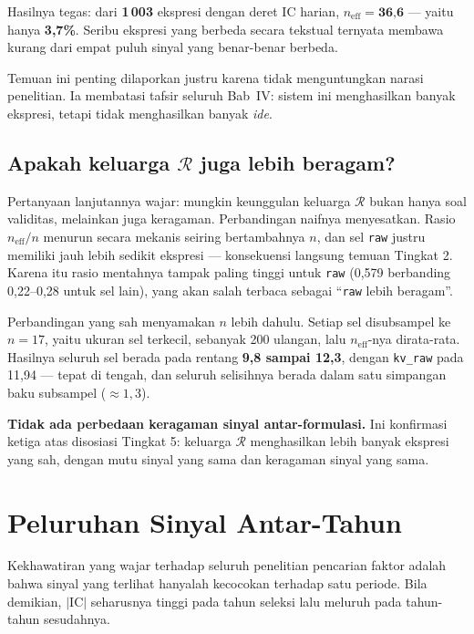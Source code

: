 \documentclass{laporanta1statugm}
\newcommand{\code}[1]{\texttt{#1}}
\begin{document}
Hasilnya tegas: dari \textbf{1\,003} ekspresi dengan deret IC harian,
$n_{\text{eff}} = \textbf{36{,}6}$ --- yaitu hanya \textbf{3,7\%}. Seribu
ekspresi yang berbeda secara tekstual ternyata membawa kurang dari empat puluh
sinyal yang benar-benar berbeda.

Temuan ini penting dilaporkan justru karena tidak menguntungkan narasi
penelitian. Ia membatasi tafsir seluruh Bab~IV: sistem ini menghasilkan banyak
ekspresi, tetapi tidak menghasilkan banyak \emph{ide}.

\subsection{Apakah keluarga $\mathcal{R}$ juga lebih beragam?}

Pertanyaan lanjutannya wajar: mungkin keunggulan keluarga $\mathcal{R}$ bukan
hanya soal validitas, melainkan juga keragaman. Perbandingan naifnya
menyesatkan. Rasio $n_{\text{eff}}/n$ menurun secara mekanis seiring
bertambahnya $n$, dan sel \code{raw} justru memiliki jauh lebih sedikit
ekspresi --- konsekuensi langsung temuan Tingkat 2. Karena itu rasio mentahnya
tampak paling tinggi untuk \code{raw} (0,579 berbanding 0,22--0,28 untuk sel
lain), yang akan salah terbaca sebagai ``\code{raw} lebih beragam''.

Perbandingan yang sah menyamakan $n$ lebih dahulu. Setiap sel disubsampel ke
$n = 17$, yaitu ukuran sel terkecil, sebanyak 200 ulangan, lalu
$n_{\text{eff}}$-nya dirata-rata. Hasilnya seluruh sel berada pada rentang
\textbf{9,8 sampai 12,3}, dengan \code{kv\_raw} pada 11,94 --- tepat di tengah,
dan seluruh selisihnya berada dalam satu simpangan baku subsampel
($\approx 1{,}3$).

\textbf{Tidak ada perbedaan keragaman sinyal antar-formulasi.} Ini konfirmasi
ketiga atas disosiasi Tingkat 5: keluarga $\mathcal{R}$ menghasilkan lebih
banyak ekspresi yang sah, dengan mutu sinyal yang sama dan keragaman sinyal
yang sama.

\section{Peluruhan Sinyal Antar-Tahun}

Kekhawatiran yang wajar terhadap seluruh penelitian pencarian faktor adalah
bahwa sinyal yang terlihat hanyalah kecocokan terhadap satu periode. Bila
demikian, $\lvert\mathrm{IC}\rvert$ seharusnya tinggi pada tahun seleksi lalu
meluruh pada tahun-tahun sesudahnya.
\end{document}
